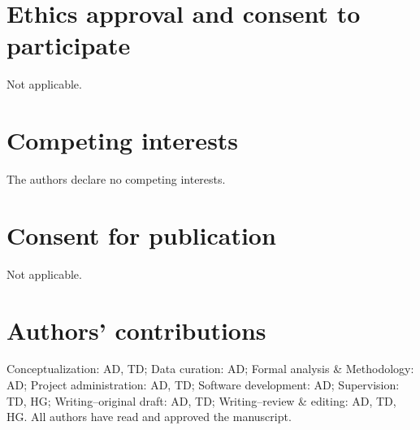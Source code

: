\documentclass[]{bmcart}
\begin{document}
\begin{backmatter}
\section*{Ethics approval and consent to participate}%
Not applicable.

\section*{Competing interests}
The authors declare no competing interests.

\section*{Consent for publication}%
Not applicable.

\section*{Authors' contributions}
Conceptualization: AD, TD; Data curation: AD; Formal analysis \&
Methodology: AD; Project administration: AD, TD; Software development:
AD; Supervision: TD, HG; Writing--original draft: AD, TD;
Writing--review \& editing: AD, TD, HG. All authors have read and
approved the manuscript.







\end{backmatter}
\end{document}
